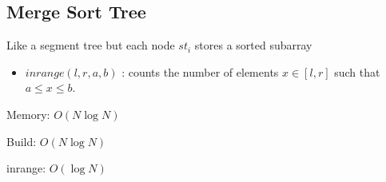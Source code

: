 \subsection{Merge Sort Tree}

Like a segment tree but each node $st_i$ stores a sorted subarray


\begin{itemize}
  \item \textbf{$inrange(l, r, a, b)$} : counts the number of elements $x \in [l, r]$ such that $ a \leq x \leq b$.
\end{itemize}

Memory: $O(N \log N)$

Build: $O(N \log N)$

inrange: $O(\log N)$
